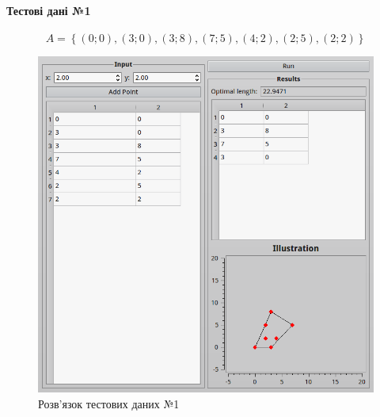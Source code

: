 \documentclass[a4paper,12pt,notitlepage,pdftex]{scrartcl}
\begin{document}
\paragraph{Тестові дані №1}
\begin{equation}
 A = \left\{ \left( 0; 0 \right), \left( 3; 0 \right), \left( 3; 8 \right),
  \left( 7; 5 \right), \left( 4; 2 \right), \left( 2; 5 \right), \left( 2; 2
\right) \right\}
  \label{eq:t1}
\end{equation}
\begin{figure}[h!]
  \centering
  \includegraphics[width=\textwidth]{scr1.png}
  \caption{Розв’язок тестових даних №1}
  \label{fig:f1}
\end{figure}
\end{document}

